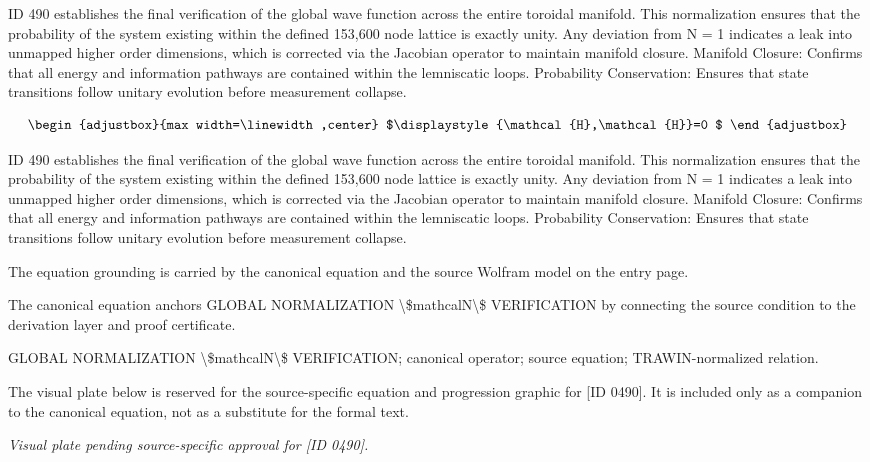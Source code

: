 ID 490 establishes the final verification of the global wave function across the entire toroidal manifold. This normalization ensures that the probability of the system existing within the defined 153,600 node lattice is exactly unity. Any deviation from N = 1 indicates a leak into unmapped higher order dimensions, which is corrected via the Jacobian operator to maintain manifold closure. Manifold Closure: Confirms that all energy and information pathways are contained within the lemniscatic loops. Probability Conservation: Ensures that state transitions follow unitary evolution before measurement collapse.

\[
\begin{adjustbox}{max width=\linewidth,center}
$\displaystyle
{\mathcal{H},\mathcal{H}}=0
$
\end{adjustbox}
\]

ID 490 establishes the final verification of the global wave function across the entire toroidal manifold. This normalization ensures that the probability of the system existing within the defined 153,600 node lattice is exactly unity. Any deviation from N = 1 indicates a leak into unmapped higher order dimensions, which is corrected via the Jacobian operator to maintain manifold closure. Manifold Closure: Confirms that all energy and information pathways are contained within the lemniscatic loops. Probability Conservation: Ensures that state transitions follow unitary evolution before measurement collapse.

The equation grounding is carried by the canonical equation and the source Wolfram model on the entry page.

The canonical equation anchors GLOBAL NORMALIZATION \textbackslash{}\$mathcalN\textbackslash{}\$ VERIFICATION by connecting the source condition to the derivation layer and proof certificate.

GLOBAL NORMALIZATION \textbackslash{}\$mathcalN\textbackslash{}\$ VERIFICATION; canonical operator; source equation; TRAWIN-normalized relation.
\endgroup

\begingroup\footnotesize\sloppy
The visual plate below is reserved for the source-specific equation and progression graphic for [ID 0490]. It is included only as a companion to the canonical equation, not as a substitute for the formal text.
\par\endgroup
\begingroup\footnotesize\itshape
Visual plate pending source-specific approval for [ID 0490].
\par\endgroup

